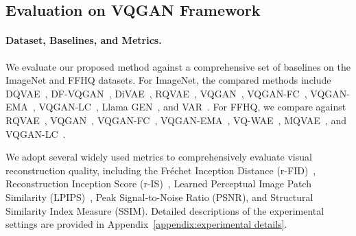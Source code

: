 


\subsection{Evaluation on VQGAN Framework}
\paragraph{Dataset, Baselines, and Metrics.}
We evaluate our proposed method against a comprehensive set of baselines on the ImageNet and FFHQ datasets. For ImageNet, the compared methods include DQVAE~\citep{Huang2023TowardsAI}, DF-VQGAN~\citep{Ni2022NWALIPLI}, DiVAE~\citep{Shi2022DiVAEPI}, RQVAE~\citep{Lee2022AutoregressiveIG}, VQGAN~\citep{Esser2020TamingTF}, VQGAN-FC~\citep{Yu2021VectorquantizedIM}, VQGAN-EMA~\citep{Razavi2019GeneratingDH}, VQGAN-LC~\citep{Zhu2024ScalingTC}, Llama GEN~\citep{Sun2024AutoregressiveMB}, and VAR~\citep{Tian2024VisualAM}.
For FFHQ, we compare against RQVAE~\citep{Lee2022AutoregressiveIG}, VQGAN~\citep{Esser2020TamingTF}, VQGAN-FC~\citep{Yu2021VectorquantizedIM}, VQGAN-EMA~\citep{Razavi2019GeneratingDH}, VQ-WAE~\citep{Vuong2023VectorQW}, MQVAE~\citep{Huang2023NotAI}, and VQGAN-LC~\citep{Zhu2024ScalingTC}.

We adopt several widely used metrics to comprehensively evaluate visual reconstruction quality, including the Fréchet Inception Distance (r-FID)~\citep{Heusel2017GANsTB}, Reconstruction Inception Score (r-IS)~\citep{Salimans2016ImprovedTF}, Learned Perceptual Image Patch Similarity (LPIPS)~\citep{Zhang2018TheUE}, Peak Signal-to-Noise Ratio (PSNR), and Structural Similarity Index Measure (SSIM). Detailed descriptions of the experimental settings are provided in Appendix~\ref{appendix:experimental details}.
\vspace{-2ex}

